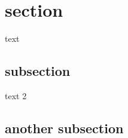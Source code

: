 \documentclass[preview]{standalone}
\begin{document}
\tableofcontents 
\section{section} 
text 
\subsection{subsection} 
text 2
\subsection{another subsection}
\end{document}
